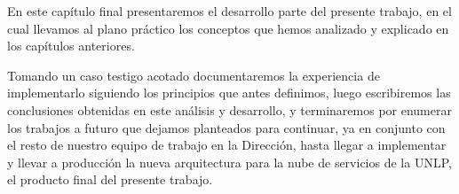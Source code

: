 En este capítulo final presentaremos el desarrollo parte del presente trabajo, en el cual llevamos al plano práctico los conceptos que hemos analizado y explicado en los capítulos anteriores.

Tomando un caso testigo acotado documentaremos la experiencia de implementarlo siguiendo los principios que antes definimos, luego escribiremos las conclusiones obtenidas en este análisis y desarrollo, y terminaremos por enumerar los trabajos a futuro que dejamos planteados para continuar, ya en conjunto con el resto de nuestro equipo de trabajo en la Dirección, hasta llegar a implementar y llevar a producción la nueva arquitectura para la nube de servicios de la UNLP, el producto final del presente trabajo.
